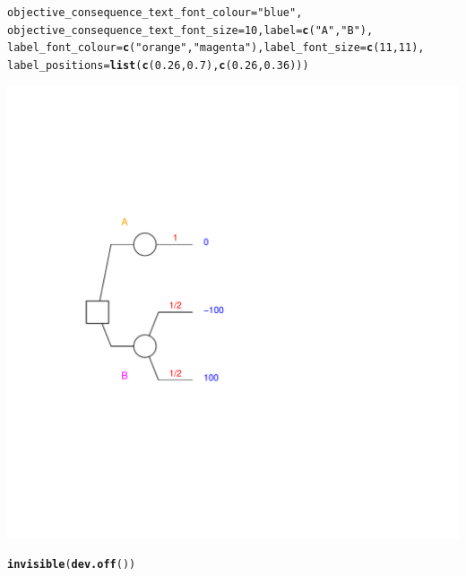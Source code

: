 \documentclass{article}\usepackage[]{graphicx}\usepackage[]{color}
\makeatletter
\newcommand{\hlnum}[1]{\textcolor[rgb]{0.686,0.059,0.569}{#1}}%
\newcommand{\hlstr}[1]{\textcolor[rgb]{0.192,0.494,0.8}{#1}}%
\newcommand{\hlstd}[1]{\textcolor[rgb]{0.345,0.345,0.345}{#1}}%
\newcommand{\hlkwc}[1]{\textcolor[rgb]{0.333,0.667,0.333}{#1}}%
\newcommand{\hlkwd}[1]{\textcolor[rgb]{0.737,0.353,0.396}{\textbf{#1}}}%
\newenvironment{kframe}{%
 \def\at@end@of@kframe{}%
 \ifinner\ifhmode%
  \def\at@end@of@kframe{\end{minipage}}%
  \begin{minipage}{\columnwidth}%
 \fi\fi%
 \def\FrameCommand##1{\hskip\@totalleftmargin \hskip-\fboxsep
 \colorbox{shadecolor}{##1}\hskip-\fboxsep
     \hskip-\linewidth \hskip-\@totalleftmargin \hskip\columnwidth}%
 \MakeFramed {\advance\hsize-\width
   \@totalleftmargin\z@ \linewidth\hsize
   \@setminipage}}%
 {\par\unskip\endMakeFramed%
 \at@end@of@kframe}
\newenvironment{knitrout}{}{} %
\makeatother
\begin{document}
\begin{knitrout}
\begin{kframe}
\begin{alltt}
        \hlkwc{objective_consequence_text_font_colour}\hlstd{=}\hlstr{"blue"}\hlstd{,}
        \hlkwc{objective_consequence_text_font_size}\hlstd{=}\hlnum{10}\hlstd{,} \hlkwc{label}\hlstd{=}\hlkwd{c}\hlstd{(}\hlstr{"A"}\hlstd{,}\hlstr{"B"}\hlstd{),}
        \hlkwc{label_font_colour}\hlstd{=}\hlkwd{c}\hlstd{(}\hlstr{"orange"}\hlstd{,}\hlstr{"magenta"}\hlstd{),} \hlkwc{label_font_size}\hlstd{=}\hlkwd{c}\hlstd{(}\hlnum{11}\hlstd{,}\hlnum{11}\hlstd{),}
        \hlkwc{label_positions}\hlstd{=}\hlkwd{list}\hlstd{(}\hlkwd{c}\hlstd{(}\hlnum{0.26}\hlstd{,}\hlnum{0.7}\hlstd{),}\hlkwd{c}\hlstd{(}\hlnum{0.26}\hlstd{,}\hlnum{0.36}\hlstd{)))}
\end{alltt}
\end{kframe}

{\centering \includegraphics[width=0.8\linewidth]{figure/unnamed-chunk-33} 

}


\begin{kframe}\begin{alltt}
\hlkwd{invisible}\hlstd{(}\hlkwd{dev.off}\hlstd{())}
\end{alltt}
\end{kframe}
\end{knitrout}
\end{document}
